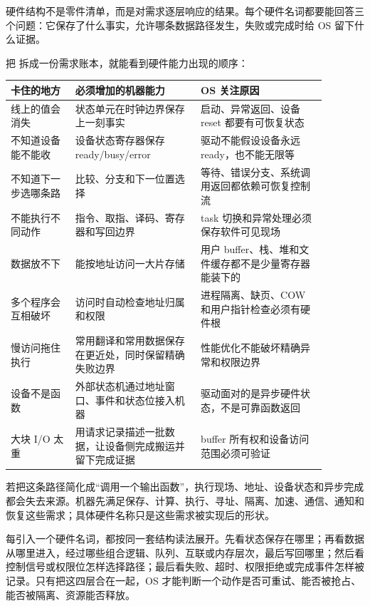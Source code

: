 \begin{keyidea}
硬件结构不是零件清单，而是对需求逐层响应的结果。每个硬件名词都要能回答三个问题：它保存了什么事实，允许哪条数据路径发生，失败或完成时给 OS 留下什么证据。
\end{keyidea}

把  拆成一份需求账本，就能看到硬件能力出现的顺序：

\begin{longtable}{p{0.18\linewidth}p{0.35\linewidth}p{0.35\linewidth}}
\toprule
卡住的地方 & 必须增加的机器能力 & OS 关注原因 \\
\midrule
线上的值会消失 & 状态单元在时钟边界保存上一刻事实 & 启动、异常返回、设备 reset 都要有可恢复状态 \\
不知道设备能不能收 & 设备状态寄存器保存 ready/busy/error & 驱动不能假设设备永远 ready，也不能无限等 \\
不知道下一步选哪条路 & 比较、分支和下一位置选择 & 等待、错误分支、系统调用返回都依赖可恢复控制流 \\
不能执行不同动作 & 指令、取指、译码、寄存器和写回边界 & task 切换和异常处理必须保存软件可见现场 \\
数据放不下 & 能按地址访问一大片存储 & 用户 buffer、栈、堆和文件缓存都不是少量寄存器能装下的 \\
多个程序会互相破坏 & 访问时自动检查地址归属和权限 & 进程隔离、缺页、COW 和用户指针检查必须有硬件根 \\
慢访问拖住执行 & 常用翻译和常用数据保存在更近处，同时保留精确失败边界 & 性能优化不能破坏精确异常和权限边界 \\
设备不是函数 & 外部状态机通过地址窗口、事件和状态位接入机器 & 驱动面对的是异步硬件状态，不是可靠函数返回 \\
大块 I/O 太重 & 用请求记录描述一批数据，让设备侧完成搬运并留下完成证据 & buffer 所有权和设备访问范围必须可验证 \\
\bottomrule
\end{longtable}

若把这条路径简化成“调用一个输出函数”，执行现场、地址、设备状态和异步完成都会失去来源。机器先满足保存、计算、执行、寻址、隔离、加速、通信、通知和恢复这些需求；具体硬件名称只是这些需求被实现后的形状。

每引入一个硬件名词，都按同一套结构读法展开。先看状态保存在哪里；再看数据从哪里进入，经过哪些组合逻辑、队列、互联或内存层次，最后写回哪里；然后看控制信号或权限位怎样选择路径；最后看失败、超时、权限拒绝或完成事件怎样被记录。只有把这四层合在一起，OS 才能判断一个动作是否可重试、能否被抢占、能否被隔离、资源能否释放。

